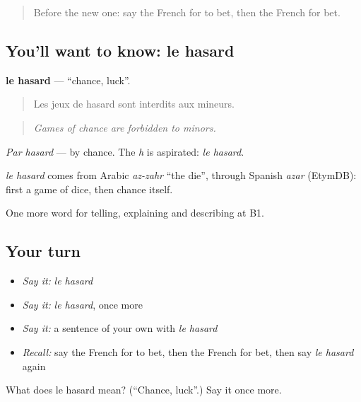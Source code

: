 \label{lesson:FR-C500-hasard}



\begin{quote}
Before the new one: say the French for to bet, then the French for bet.
\end{quote}

\subsection*{You'll want to know: le hasard}
\textbf{le hasard} — \textquotedblleft{}chance, luck\textquotedblright{}.

\begin{quote}
Les jeux de hasard sont interdits aux mineurs.
\end{quote}

\begin{quote}
\emph{Games of chance are forbidden to minors.}
\end{quote}

\emph{Par hasard} — by chance. The \emph{h} is aspirated: \emph{le hasard}.

\begin{cousinweb}
\emph{le hasard} comes from Arabic \emph{az-zahr} \textquotedblleft{}the die\textquotedblright{}, through Spanish \emph{azar} (EtymDB): first a game of dice, then chance itself.
\end{cousinweb}

\begin{grammarlens}[title={What you've built}]
One more word for telling, explaining and describing at B1.
\end{grammarlens}

\subsection*{Your turn}
\begin{itemize}
\raggedright
  \item \emph{Say it:} \emph{le hasard}
  \item \emph{Say it:} \emph{le hasard}, once more
  \item \emph{Say it:} a sentence of your own with \emph{le hasard}
  \item \emph{Recall:} say the French for to bet, then the French for bet, then say \emph{le hasard} again
\end{itemize}

\begin{tcolorbox}[breakable,colback=teal!4,colframe=teal!35!black,title={Before you move on}]
What does le hasard mean? (\textquotedblleft{}Chance, luck\textquotedblright{}.) Say it once more.
\end{tcolorbox}
